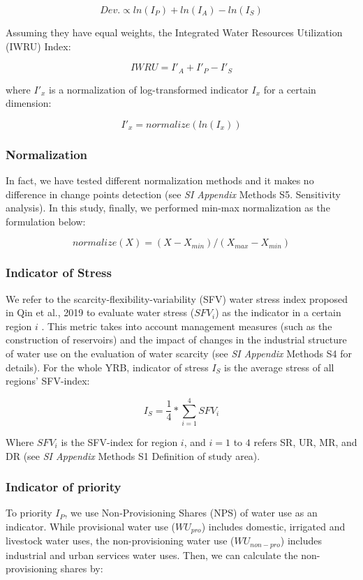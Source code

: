 \documentclass[9pt, twocolumn, twoside, lineno]{pnas-new}
\begin{document}
{	$$ Dev. \propto ln(I_P) + ln(I_A) - ln(I_S) $$

	Assuming they have equal weights, the Integrated Water Resources Utilization (IWRU) Index:

	$$ IWRU = I'_A + I'_P - I'_S $$

	where $I'_x$ is a normalization of log-transformed indicator $I_x$ for a certain dimension:

	$$ I'_x = normalize(ln(I_x)) $$
	
	\subsubsection*{Normalization}
	In fact, we have tested different normalization methods and it makes no difference in change points detection (see \textit{SI Appendix} Methods S5. Sensitivity analysis). In this study, finally, we performed min-max normalization as the formulation below:

	$$ normalize(X) = (X - X_{min}) / (X_{max} - X_{min}) $$

	\subsubsection*{Indicator of Stress}
	We refer to the scarcity-flexibility-variability (SFV) water stress index proposed in Qin et al., 2019 to evaluate water stress ($SFV_i$) as the indicator in a certain region $i$ \cite{qinFlexibilityIntensityGlobal2019}. This metric takes into account management measures (such as the construction of reservoirs) and the impact of changes in the industrial structure of water use on the evaluation of water scarcity (see \textit{SI Appendix} Methods S4 for details). For the whole YRB, indicator of stress $I_S$ is the average stress of all regions' SFV-index: 

	$$ I_S = \frac{1}{4} * \sum_{i=1}^4 SFV_{i} $$
	
	Where $SFV_i$ is the SFV-index for region $i$, and $i=1$ to $4$ refers SR, UR, MR, and DR (see \textit{SI Appendix} Methods S1 Definition of study area).

	\subsubsection*{Indicator of priority}
	To priority $I_P$, we use Non-Provisioning Shares (NPS) of water use as an indicator. While provisional water use ($WU_{pro}$) includes domestic, irrigated and livestock water uses, the non-provisioning water use ($WU_{non-pro}$) includes industrial and urban services water uses. Then, we can calculate the non-provisioning shares by:

}
\end{document}
